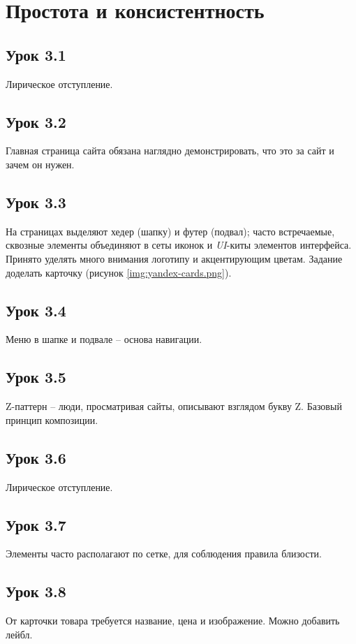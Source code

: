\documentclass[variant=practice]{bsuir}
\begin{document}
\section{Простота и консистентность}

\subsection{Урок 3.1} Лирическое отступление.

\subsection{Урок 3.2} Главная страница сайта обязана наглядно демонстрировать,
что это за сайт и зачем он нужен.

\subsection{Урок 3.3} На страницах выделяют хедер (шапку) и футер (подвал);
часто встречаемые, сквозные элементы объединяют в сеты иконок и \textit{UI}-киты
элементов интерфейса. Принято уделять много внимания логотипу и акцентирующим
цветам. Задание доделать карточку (рисунок \ref{img:yandex-cards.png}).


\subsection{Урок 3.4} Меню в шапке и подвале -- основа навигации.

\subsection{Урок 3.5} Z-паттерн -- люди, просматривая сайты, описывают взглядом
букву Z. Базовый принцип композиции.

\subsection{Урок 3.6} Лирическое отступление.

\subsection{Урок 3.7} Элементы часто располагают по сетке, для соблюдения
правила близости.

\subsection{Урок 3.8} От карточки товара требуется название, цена и изображение.
Можно добавить лейбл.
\end{document}
